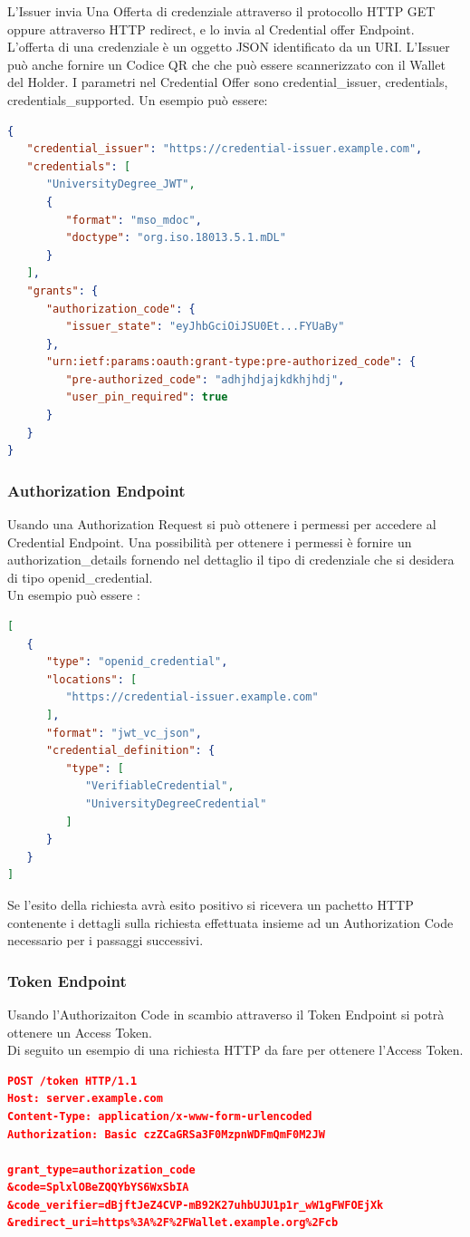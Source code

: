 L'Issuer invia Una Offerta di credenziale attraverso il protocollo HTTP GET oppure attraverso HTTP redirect, e lo invia al Credential offer Endpoint.
L'offerta di una credenziale è un oggetto JSON identificato da un URI.
L'Issuer può anche fornire un Codice QR che che può essere scannerizzato con il Wallet del Holder.
I parametri nel Credential Offer sono credential\_issuer, credentials, credentials\_supported.
Un esempio può essere:
\begin{lstlisting}[language=json,firstnumber=1]
{
   "credential_issuer": "https://credential-issuer.example.com",
   "credentials": [
      "UniversityDegree_JWT",
      {
         "format": "mso_mdoc",
         "doctype": "org.iso.18013.5.1.mDL"
      }
   ],
   "grants": {
      "authorization_code": {
         "issuer_state": "eyJhbGciOiJSU0Et...FYUaBy"
      },
      "urn:ietf:params:oauth:grant-type:pre-authorized_code": {
         "pre-authorized_code": "adhjhdjajkdkhjhdj",
         "user_pin_required": true
      }
   }
}
\end{lstlisting}

\subsubsection{Authorization Endpoint}
Usando una Authorization Request si può ottenere i permessi per accedere al Credential Endpoint.
Una possibilità per ottenere i permessi è fornire un authorization\_details fornendo nel dettaglio il tipo di credenziale che si desidera
di tipo openid\_credential.\\
Un esempio può essere :
\begin{lstlisting}[language=json,firstnumber=1]
[
   {
      "type": "openid_credential",
      "locations": [
         "https://credential-issuer.example.com"
      ],
      "format": "jwt_vc_json",
      "credential_definition": {
         "type": [
            "VerifiableCredential",
            "UniversityDegreeCredential"
         ]
      }
   }
]
\end{lstlisting}
Se l'esito della richiesta avrà esito positivo si ricevera un pachetto HTTP contenente i dettagli sulla 
richiesta effettuata insieme ad un Authorization Code necessario per i passaggi successivi.
\subsubsection{Token Endpoint}
Usando l'Authorizaiton Code in scambio attraverso il Token Endpoint si potrà ottenere un Access Token.\\
Di seguito un esempio di una richiesta HTTP da fare per ottenere l'Access Token.
\begin{lstlisting}[language=json,firstnumber=1]
POST /token HTTP/1.1
Host: server.example.com
Content-Type: application/x-www-form-urlencoded
Authorization: Basic czZCaGRSa3F0MzpnWDFmQmF0M2JW

grant_type=authorization_code
&code=SplxlOBeZQQYbYS6WxSbIA
&code_verifier=dBjftJeZ4CVP-mB92K27uhbUJU1p1r_wW1gFWFOEjXk
&redirect_uri=https%3A%2F%2FWallet.example.org%2Fcb
\end{lstlisting}

